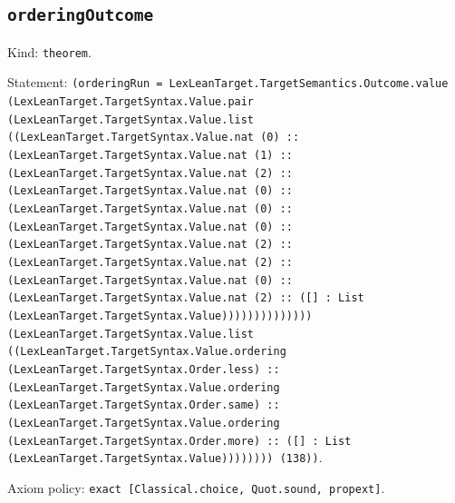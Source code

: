\documentclass[11pt]{article}
\begin{document}
\subsection*{\texttt{orderingOutcome}}
\noindent Kind: \texttt{theorem}.\par
\noindent Statement: \texttt{(orderingRun = LexLeanTarget.TargetSemantics.Outcome.value (LexLeanTarget.TargetSyntax.Value.pair (LexLeanTarget.TargetSyntax.Value.list ((LexLeanTarget.TargetSyntax.Value.nat (0) :: (LexLeanTarget.TargetSyntax.Value.nat (1) :: (LexLeanTarget.TargetSyntax.Value.nat (2) :: (LexLeanTarget.TargetSyntax.Value.nat (0) :: (LexLeanTarget.TargetSyntax.Value.nat (0) :: (LexLeanTarget.TargetSyntax.Value.nat (0) :: (LexLeanTarget.TargetSyntax.Value.nat (2) :: (LexLeanTarget.TargetSyntax.Value.nat (2) :: (LexLeanTarget.TargetSyntax.Value.nat (0) :: (LexLeanTarget.TargetSyntax.Value.nat (2) :: ([] : List (LexLeanTarget.TargetSyntax.Value)))))))))))))) (LexLeanTarget.TargetSyntax.Value.list ((LexLeanTarget.TargetSyntax.Value.ordering (LexLeanTarget.TargetSyntax.Order.less) :: (LexLeanTarget.TargetSyntax.Value.ordering (LexLeanTarget.TargetSyntax.Order.same) :: (LexLeanTarget.TargetSyntax.Value.ordering (LexLeanTarget.TargetSyntax.Order.more) :: ([] : List (LexLeanTarget.TargetSyntax.Value)))))))) (138))}.\par
\noindent Axiom policy: \texttt{exact [Classical.choice, Quot.sound, propext]}.\par
\end{document}
